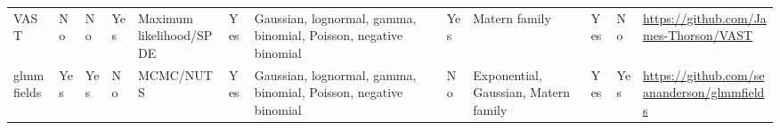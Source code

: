 \documentclass[12pt,english]{article}
\begin{document}
\begin{landscape}
\begin{table}
\begin{minipage}{\textwidth}
\begin{scriptsize}
\begin{tabular}{llllL{2cm}lL{2.4cm}lL{2.0cm}llL{2.0cm}}
        VAST     & No             & No      & Yes     & Maximum likelihood/SPDE     & Yes        & Gaussian, lognormal, gamma, binomial, Poisson, negative binomial  & Yes      & Matern family                                     & Yes                   & No        & \url{https://github.com/James-Thorson/VAST}                      \\
        glmmfields & Yes          & Yes     & No      & MCMC/NUTS                   & Yes        & Gaussian, lognormal, gamma, binomial, Poisson, negative binomial  & No       & Exponential, Gaussian, Matern family              & Yes                   & Yes       & \url{https://github.com/seananderson/glmmfields}                  \\
        \bottomrule
      \end{tabular}
    \end{scriptsize}
  \end{minipage}
  \end{table}
\end{landscape}
\end{document}

